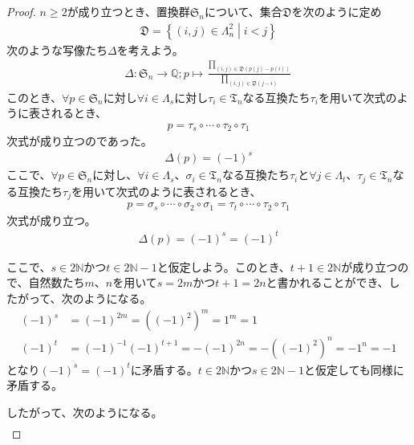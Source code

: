 \documentclass[dvipdfmx]{jsarticle}
\begin{document}
\begin{proof}
$n \geq 2$が成り立つとき、置換群$\mathfrak{S}_{n}$について、集合$\mathfrak{D}$を次のように定め
\begin{align*}
\mathfrak{D} = \left\{ (i,j) \in \varLambda_{n}^{2} \middle| i < j \right\}
\end{align*}
次のような写像たち$\varDelta$を考えよう。
\begin{align*}
\varDelta:\mathfrak{S}_{n} \rightarrow \mathbb{Q};p \mapsto \frac{\prod_{(i,j) \in \mathfrak{D} \left( p(j) - p(i) \right)}}{\prod_{(i,j)\in \mathfrak{D} (j - i)}}
\end{align*}
このとき、$\forall p \in \mathfrak{S}_{n}$に対し$\forall i \in \varLambda_{s}$に対し$\tau_{i} \in \mathfrak{T}_{n}$なる互換たち$\tau_{i}$を用いて次式のように表されるとき、
\begin{align*}
p = \tau_{s} \circ \cdots \circ \tau_{2} \circ \tau_{1}
\end{align*}
次式が成り立つのであった。
\begin{align*}
\varDelta(p) = ( - 1)^{s}
\end{align*}
ここで、$\forall p \in \mathfrak{S}_{n}$に対し、$\forall i \in \varLambda_{s}$、$\sigma_{i} \in \mathfrak{T}_{n}$なる互換たち$\tau_{i}$と$\forall j \in \varLambda_{t}$、$\tau_{j} \in \mathfrak{T}_{n}$なる互換たち$\tau_{j}$を用いて次式のように表されるとき、
\begin{align*}
p = \sigma_{s} \circ \cdots \circ \sigma_{2} \circ \sigma_{1} = \tau_{t} \circ \cdots \circ \tau_{2} \circ \tau_{1}
\end{align*}
次式が成り立つ。
\begin{align*}
\varDelta(p) = ( - 1)^{s} = ( - 1)^{t}
\end{align*}\par
ここで、$s \in 2\mathbb{N}$かつ$t \in 2\mathbb{N} - 1$と仮定しよう。このとき、$t + 1 \in 2\mathbb{N}$が成り立つので、自然数たち$m$、$n$を用いて$s = 2m$かつ$t + 1 = 2n$と書かれることができ、したがって、次のようになる。
\begin{align*}
( - 1)^{s} &= ( - 1)^{2m} = \left( ( - 1)^{2} \right)^{m} = 1^{m} = 1\\
( - 1)^{t} &= ( - 1)^{- 1}( - 1)^{t + 1} = - ( - 1)^{2n} = - \left( ( - 1)^{2} \right)^{n} = - 1^{n} = - 1
\end{align*}
となり$( - 1)^{s} = ( - 1)^{t}$に矛盾する。$t \in 2\mathbb{N}$かつ$s \in 2\mathbb{N} - 1$と仮定しても同様に矛盾する。\par
したがって、次のようになる。
\begin{align*}

\end{align*}
\end{proof}
\end{document}
